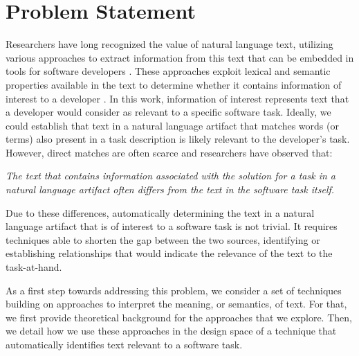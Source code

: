 
\section{Problem Statement}
\label{cp5:motivation}





Researchers have long recognized the value of natural language
text, utilizing various approaches to extract
information from this text that can be embedded in
tools for software developers .
These approaches exploit lexical and semantic properties available in the text to determine 
whether it contains information of interest to a developer . 
In this work, information of interest represents text that a developer would consider as relevant to a specific software task. Ideally, we could establish that text in a natural language artifact that matches  
words (or terms) also present in a task description is likely relevant to the developer's task. However, direct matches are often scarce and researchers have observed that:



\medskip
\begin{bluequote}
    \textit{The text  that contains information associated with the solution for a task in a natural language artifact often differs from the text in the software task itself.}
\end{bluequote}



Due to these differences, automatically determining the text in a natural language artifact that is of interest to a software task is not trivial. 
It requires techniques able to shorten the gap between the two sources, identifying or establishing relationships that would indicate the relevance of the text to the task-at-hand.


As a first step towards addressing this problem, we consider a set of techniques
 building on approaches to interpret the meaning, or semantics, of text.
 For that, we first provide theoretical background for the approaches that we explore. Then, we detail how we use these approaches in the design space of a technique that automatically identifies text relevant to a software task.






